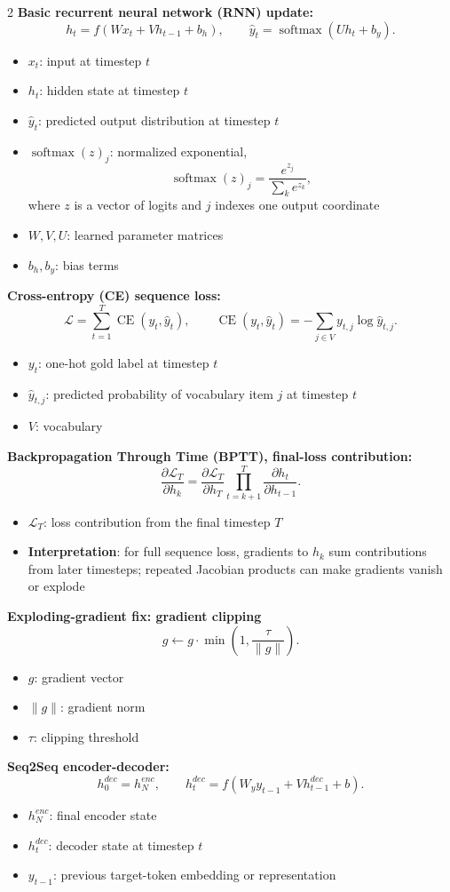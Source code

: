\documentclass[10pt]{article}
\newcommand{\softmax}{\operatorname{softmax}}
\newcommand{\CE}{\operatorname{CE}}
\newenvironment{symdefs}{\begin{itemize}[leftmargin=1.1em, topsep=1pt, itemsep=0pt, parsep=0pt]}{\end{itemize}}
\newcommand{\sym}[2]{\item \textbf{#1}: #2}
\begin{document}
\begin{multicols*}{2}
\textbf{Basic recurrent neural network (RNN) update:}
\[
h_t = f(Wx_t + Vh_{t-1} + b_h),
\qquad
\hat{y}_t = \softmax(Uh_t + b_y).
\]
\begin{symdefs}
\sym{\(x_t\)}{input at timestep \(t\)}
\sym{\(h_t\)}{hidden state at timestep \(t\)}
\sym{\(\hat{y}_t\)}{predicted output distribution at timestep \(t\)}
\sym{\(\softmax(z)_j\)}{normalized exponential,
\[
\softmax(z)_j=\frac{e^{z_j}}{\sum_k e^{z_k}},
\]
where \(z\) is a vector of logits and \(j\) indexes one output coordinate}
\sym{\(W,V,U\)}{learned parameter matrices}
\sym{\(b_h,b_y\)}{bias terms}
\end{symdefs}

\textbf{Cross-entropy (CE) sequence loss:}
\[
\mathcal{L}=\sum_{t=1}^{T}\CE(y_t,\hat{y}_t),
\qquad
\CE(y_t,\hat{y}_t)= -\sum_{j \in V} y_{t,j}\log \hat{y}_{t,j}.
\]
\begin{symdefs}
\sym{\(y_t\)}{one-hot gold label at timestep \(t\)}
\sym{\(\hat{y}_{t,j}\)}{predicted probability of vocabulary item \(j\) at timestep \(t\)}
\sym{\(V\)}{vocabulary}
\end{symdefs}

\textbf{Backpropagation Through Time (BPTT), final-loss contribution:}
\[
\frac{\partial \mathcal{L}_T}{\partial h_k}
=
\frac{\partial \mathcal{L}_T}{\partial h_T}
\prod_{t=k+1}^{T}
\frac{\partial h_t}{\partial h_{t-1}}.
\]
\begin{symdefs}
\sym{\(\mathcal{L}_T\)}{loss contribution from the final timestep \(T\)}
\sym{Interpretation}{for full sequence loss, gradients to \(h_k\) sum contributions from later timesteps; repeated Jacobian products can make gradients vanish or explode}
\end{symdefs}

\textbf{Exploding-gradient fix: gradient clipping}
\[
g \leftarrow g \cdot \min\left(1,\frac{\tau}{\lVert g \rVert}\right).
\]
\begin{symdefs}
\sym{\(g\)}{gradient vector}
\sym{\(\lVert g \rVert\)}{gradient norm}
\sym{\(\tau\)}{clipping threshold}
\end{symdefs}

\textbf{Seq2Seq encoder-decoder:}
\[
h^{dec}_0 = h^{enc}_N,
\qquad
h^{dec}_t = f(W_y y_{t-1} + V h^{dec}_{t-1} + b).
\]
\begin{symdefs}
\sym{\(h_N^{enc}\)}{final encoder state}
\sym{\(h_t^{dec}\)}{decoder state at timestep \(t\)}
\sym{\(y_{t-1}\)}{previous target-token embedding or representation}
\end{symdefs}


\end{multicols*}
\end{document}
